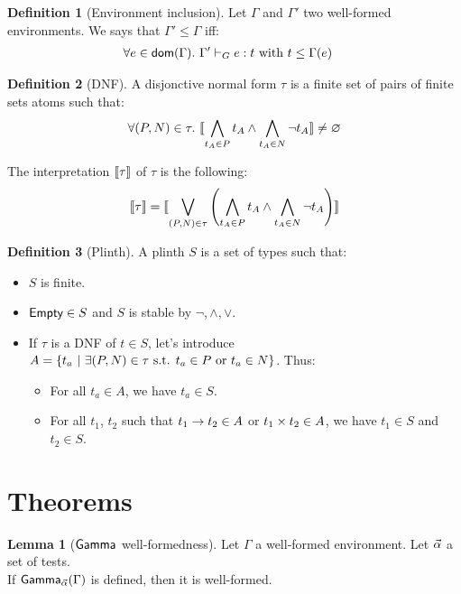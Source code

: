 \documentclass[a4paper]{article}
\theoremstyle{definition}
\newtheorem{lemma}{Lemma}
\newtheorem{definition}{Definition}
\begin{document}
    \begin{definition}[Environment inclusion]
      Let $\Gamma$ and $\Gamma'$ two well-formed environments. We says that $\Gamma' \leq \Gamma$ iff:
      \begin{align*}
        &\forall e \in \textsf{dom}(\Gamma).\ \Gamma' \vdash_G e : t \text{ with } t \leq \Gamma(e)
      \end{align*}
    \end{definition}

    \begin{definition}[DNF]
      A disjonctive normal form $\tau$ is a finite set of pairs of finite sets atoms such that:
      \[ \forall (P,N)\in \tau.\ {\llbracket \bigwedge_{t_A \in P} t_A \land \bigwedge_{t_A \in N} \neg t_A \rrbracket} \neq \varnothing \]

      The interpretation ${\llbracket \tau \rrbracket}$ of $\tau$ is the following:
      \[
        {\llbracket \tau \rrbracket} = {\llbracket \bigvee_{(P,N)\in \tau} \left(\bigwedge_{t_A \in P} t_A \land \bigwedge_{t_A \in N} \neg t_A \right) \rrbracket}
      \]
    \end{definition}
    
    \begin{definition}[Plinth]
      A plinth $S$ is a set of types such that:
      \begin{itemize}
        \item $S$ is finite.
        \item $\textsf{Empty} \in S$ and $S$ is stable by $\neg, \land, \vee$. 
        \item If $\tau$ is a DNF of $t\in S$, let's introduce $A=\{t_a ~|~ \exists (P,N) \in \tau \text{ s.t. } t_a \in P \text{ or } t_a \in N \}$. Thus:
        \begin{itemize}
          \item For all $t_a \in A$, we have $t_a \in S$.
          \item For all $t_1$, $t_2$ such that $t_1\to t_2 \in A$ or $t_1\times t_2 \in A$,
          we have $t_1 \in S$ and $t_2 \in S$.
        \end{itemize}
      \end{itemize}
    \end{definition}

    \section{Theorems}

        \begin{lemma}[$\textsf{Gamma}_{} $ well-formedness]
          Let $\Gamma$ a well-formed environment. Let $\vec \alpha$ a set of tests.\\
          If $\textsf{Gamma}_{\vec \alpha}(\Gamma)$ is defined, then it is well-formed.
        \end{lemma}
\end{document}
